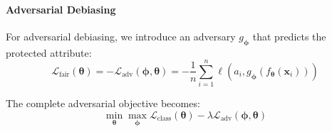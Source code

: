 \paragraph{Adversarial Debiasing}

For adversarial debiasing, we introduce an adversary $g_{\boldsymbol{\phi}}$ that predicts the protected attribute:
\begin{equation}
\mathcal{L}_{\text{fair}}(\boldsymbol{\theta}) = -\mathcal{L}_{\text{adv}}(\boldsymbol{\phi}, \boldsymbol{\theta}) = -\frac{1}{n} \sum_{i=1}^n \ell(a_i, g_{\boldsymbol{\phi}}(f_{\boldsymbol{\theta}}(\mathbf{x}_i))) \label{eq:adversarial_loss}
\end{equation}

The complete adversarial objective becomes:
\begin{equation}
\min_{\boldsymbol{\theta}} \max_{\boldsymbol{\phi}} \mathcal{L}_{\text{class}}(\boldsymbol{\theta}) - \lambda \mathcal{L}_{\text{adv}}(\boldsymbol{\phi}, \boldsymbol{\theta}) \label{eq:minimax}
\end{equation}
